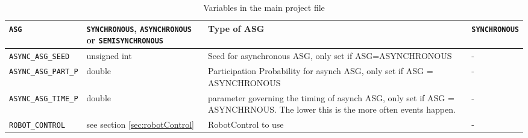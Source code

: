 \begin{sidewaystable}
\begin{tabular}{|l|p{}|p{}|p{}|}
		\texttt{ASG} & \texttt{SYNCHRONOUS}, \texttt{ASYNCHRONOUS} or \texttt{SEMISYNCHRONOUS} & Type of ASG & \texttt{SYNCHRONOUS}\\\hline
		  \texttt{ASYNC\_ASG\_SEED} & unsigned int & Seed for asynchronous ASG, only set if ASG=ASYNCHRONOUS & - \\\hline
		    \texttt{ASYNC\_ASG\_PART\_P} & double & Participation Probability for asynch ASG, only set if ASG = ASYNCHRONOUS & - \\\hline
		 \texttt{ASYNC\_ASG\_TIME\_P} & double & parameter governing the timing of asynch ASG, only set if ASG = ASYNCHRNOUS. The lower this is the more often events happen. & - \\\hline
		 
		\texttt{ROBOT\_CONTROL} &  see section \ref{sec:robotControl} & RobotControl to use & -\\\hline
		 
	\end{tabular}
	\caption{Variables in the main project file}\label{tab:mainvars}
\end{sidewaystable}
\thispagestyle{empty}
\clearpage

